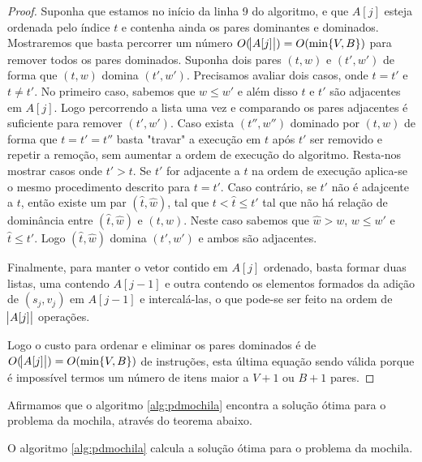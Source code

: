 \begin{proof}
Suponha que estamos no início da linha 9 do algoritmo, e que $A[j]$ esteja ordenada pelo índice $t$ e contenha ainda os pares dominantes e dominados. Mostraremos que basta percorrer um número $O(\abs{A[j]}) = O(\min\{V,B\})$ para remover todos os pares dominados. Suponha dois pares $(t,w)$ e $(t',w')$ de forma que $(t,w)$ domina $(t',w')$.
Precisamos avaliar dois casos, onde $t=t'$ e $t \neq t'$. No primeiro caso, sabemos que $w \leq w'$ e além disso $t$ e $t'$ são adjacentes em $A[j]$. Logo percorrendo a lista uma vez e comparando os pares adjacentes é suficiente para remover $(t',w')$. Caso exista $(t'',w'')$ dominado por $(t,w)$ de forma que $t=t'=t''$ basta "travar" a execução em $t$ após $t'$ ser removido e repetir a remoção, sem aumentar a ordem de execução do algoritmo.
Resta-nos mostrar casos onde $t' > t$. Se $t'$ for adjacente a $t$ na ordem de execução aplica-se o mesmo procedimento descrito para $t=t'$. Caso contrário, se $t'$ não é adajcente a $t$, então existe um par $(\hat{t}, \hat{w})$, tal que $t < \hat{t} \leq t'$ tal que não há relação de dominância entre $(\hat{t}, \hat{w})$ e $(t,w)$. Neste caso sabemos que $\hat{w} > w$, $ w \leq w'$ e $\hat{t} \leq t'$. Logo $(\hat{t}, \hat{w})$ domina $(t',w')$ e ambos são adjacentes. 

Finalmente, para manter o vetor contido em $A[j]$ ordenado, basta formar duas listas, uma contendo $A[j-1]$ e outra contendo os elementos formados da adição de $(s_j,v_j)$ em $A[j-1]$ e intercalá-las, o que pode-se ser feito na ordem de $\abs{A[j]}$ operações.

Logo o custo para ordenar e eliminar os pares dominados é de $O(\abs{A[j]}) = O(\min\{V,B\})$ de instruções, esta última equação sendo válida porque é impossível termos um número de itens maior a $V+1$ ou $B+1$ pares.
\end{proof}

Afirmamos que o algoritmo \ref{alg:pdmochila} encontra a solução ótima para o problema da mochila, através do teorema abaixo.

\begin{teorema}
O algoritmo \ref{alg:pdmochila} calcula a solução ótima para o problema da mochila.
\end{teorema}

